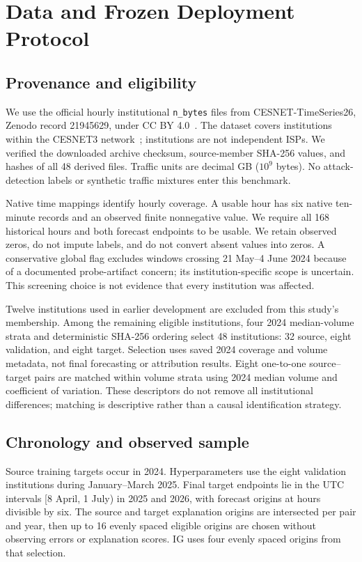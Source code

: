 \documentclass[conference]{IEEEtran}
\begin{document}
\section{Data and Frozen Deployment Protocol}
\subsection{Provenance and eligibility}
We use the official hourly institutional \texttt{n\_bytes} files from CESNET-TimeSeries26, Zenodo record 21945629, under CC BY 4.0~\cite{dataset}. The dataset covers institutions within the CESNET3 network~\cite{cesnet26}; institutions are not independent ISPs. We verified the downloaded archive checksum, source-member SHA-256 values, and hashes of all 48 derived files. Traffic units are decimal GB ($10^9$ bytes). No attack-detection labels or synthetic traffic mixtures enter this benchmark.

Native time mappings identify hourly coverage. A usable hour has six native ten-minute records and an observed finite nonnegative value. We require all 168 historical hours and both forecast endpoints to be usable. We retain observed zeros, do not impute labels, and do not convert absent values into zeros. A conservative global flag excludes windows crossing 21 May--4 June 2024 because of a documented probe-artifact concern; its institution-specific scope is uncertain. This screening choice is not evidence that every institution was affected.

Twelve institutions used in earlier development are excluded from this study's membership. Among the remaining eligible institutions, four 2024 median-volume strata and deterministic SHA-256 ordering select 48 institutions: 32 source, eight validation, and eight target. Selection uses saved 2024 coverage and volume metadata, not final forecasting or attribution results. Eight one-to-one source--target pairs are matched within volume strata using 2024 median volume and coefficient of variation. These descriptors do not remove all institutional differences; matching is descriptive rather than a causal identification strategy.

\subsection{Chronology and observed sample}
Source training targets occur in 2024. Hyperparameters use the eight validation institutions during January--March 2025. Final target endpoints lie in the UTC intervals [8 April, 1 July) in 2025 and 2026, with forecast origins at hours divisible by six. The source and target explanation origins are intersected per pair and year, then up to 16 evenly spaced eligible origins are chosen without observing errors or explanation scores. IG uses four evenly spaced origins from that selection.
\end{document}
